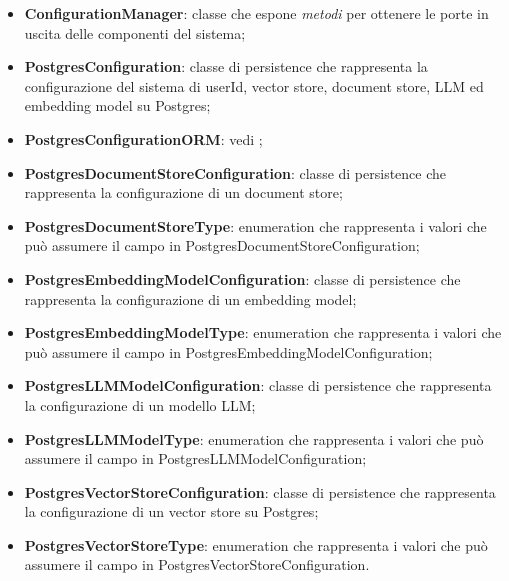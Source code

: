\documentclass[10pt, a4paper]{article}
\begin{document}
\begin{itemize}
    \item \label{ConfigurationManager}\textbf{ConfigurationManager}: classe che espone \textit{metodi\pg} per ottenere le porte in uscita delle componenti del sistema;
    \item \label{PostgresConfiguration}\textbf{PostgresConfiguration}: classe di persistence che rappresenta la configurazione del sistema di userId, vector store, document store, LLM ed embedding model su Postgres;
    \item \textbf{PostgresConfigurationORM}: vedi ;
    \item \label{PostgresDocumentStoreConfiguration}\textbf{PostgresDocumentStoreConfiguration}: classe di persistence che rappresenta la configurazione di un document store;
    \item \label{PostgresDocumentStoreType}\textbf{PostgresDocumentStoreType}: enumeration che rappresenta i valori che può assumere il campo  in PostgresDocumentStoreConfiguration;

    \item \label{PostgresEmbeddingModelConfiguration}\textbf{PostgresEmbeddingModelConfiguration}: classe di persistence che rappresenta la configurazione di un embedding model;
    \item \label{PostgresEmbeddingModelType}\textbf{PostgresEmbeddingModelType}: enumeration che rappresenta i valori che può assumere il campo  in PostgresEmbeddingModelConfiguration;
    \item \label{PostgresLLMModelConfiguration}\textbf{PostgresLLMModelConfiguration}: classe di persistence che rappresenta la configurazione di un modello LLM;
    \item \label{PostgresLLMModelType}\textbf{PostgresLLMModelType}: enumeration che rappresenta i valori che può assumere il campo  in PostgresLLMModelConfiguration;

    \item \label{PostgresVectorStoreConfiguration}\textbf{PostgresVectorStoreConfiguration}: classe di persistence che rappresenta la configurazione di un vector store su Postgres;
    \item \label{PostgresVectorStoreType}\textbf{PostgresVectorStoreType}: enumeration che rappresenta i valori che può assumere il campo  in PostgresVectorStoreConfiguration.
   
    
\end{itemize}
 
\end{document}
